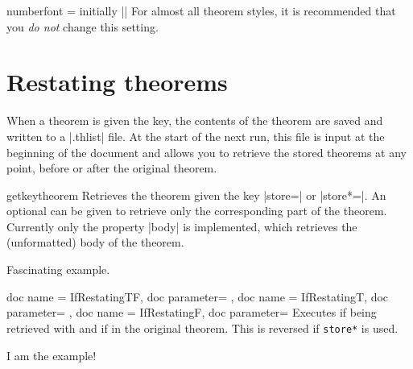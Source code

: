 \documentclass{ltxdoc}
\begin{document}
\begin{docKey}{numberfont}
  {=}
  {initially |\upshape|}
For almost all theorem styles, it is recommended that you \emph{do not} change this setting.
\end{docKey}

\section{Restating theorems}

When a theorem is given the  key, the contents of the theorem are saved and written to a |.thlist| file.
At the start of the next run, this file is input at the beginning of the document and allows you to retrieve the stored theorems at any point, before or after the original theorem.

\begin{docCommand}{getkeytheorem}
  {}
Retrieves the theorem given the key |store=| or |store*=|.
An optional  can be given to retrieve only the corresponding part of the theorem.
Currently only the property |body| is implemented, which retrieves the (unformatted) body of the theorem.

\begin{keythmscode}[]

\begin{example}[store=mytag]
Fascinating example.
\end{example}

\end{keythmscode}

\end{docCommand}

\begin{docCommands}
  {
    {
      doc name = IfRestatingTF,
      doc parameter=
    },
    {
      doc name = IfRestatingT,
      doc parameter=
    },
    {
      doc name = IfRestatingF,
      doc parameter=
    }
  }
Executes  if being retrieved with  and  if in the original theorem. This is reversed if \texttt{store*} is used.

\begin{keythmscode}[]
\begin{example}[store=hmm]
I am the
example!
\end{example}

\end{keythmscode}

\end{docCommands}
\end{document}
